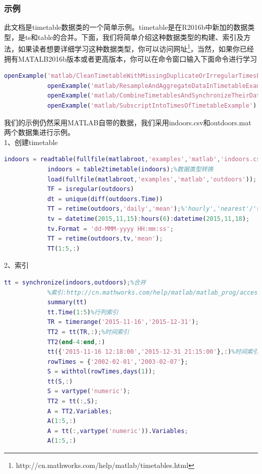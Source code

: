             \subsubsection{示例}
            此文档是timetable数据类的一个简单示例。timetable是在R2016b中新加的数据类型，是ts和table的合并。下面，我们将简单介绍这种数据类型的构建、索引及方法，如果读者想要详细学习这种数据类型，你可以访问网址\footnote{http://cn.mathworks.com/help/matlab/timetables.html}，当然，如果你已经拥有MATALB2016b版本或者更高版本，你可以在命令窗口输入下面命令进行学习
            \begin{lstlisting}[language = Matlab]
            openExample('matlab/CleanTimetableWithMissingDuplicateOrIrregularTimesExample')
            openExample('matlab/ResampleAndAggregateDataInTimetableExample')
            openExample('matlab/CombineTimetablesAndSynchronizeTheirDataExample')
            openExample('matlab/SubscriptIntoTimesOfTimetableExample')
            \end{lstlisting}
            \par
            我们的示例仍然采用MATLAB自带的数据，我们采用indoors.csv和outdoors.mat两个数据集进行示例。\\
            1、创建timetable
                \begin{lstlisting}[language=Matlab]
            indoors = readtable(fullfile(matlabroot,'examples','matlab','indoors.csv'));
            indoors = table2timetable(indoors);%数据类型转换
            load(fullfile(matlabroot,'examples','matlab','outdoors'));
            TF = isregular(outdoors)
            dt = unique(diff(outdoors.Time))
            TT = retime(outdoors,'daily','mean');%'hourly','nearest'/'spline'
            tv = datetime(2015,11,15):hours(6):datetime(2015,11,18);
            tv.Format = 'dd-MMM-yyyy HH:mm:ss';
            TT = retime(outdoors,tv,'mean');
            TT(1:5,:)
                \end{lstlisting}
            2、索引
                \begin{lstlisting}[language=Matlab]
            tt = synchronize(indoors,outdoors);%合并
            %索引:http://cn.mathworks.com/help/matlab/matlab_prog/access-data-in-a-table.html
            summary(tt)
            tt.Time(1:5)%行列索引
            TR = timerange('2015-11-16','2015-12-31');
            TT2 = tt(TR,:);%时间索引
            TT2(end-4:end,:)
            tt({'2015-11-16 12:18:00','2015-12-31 21:15:00'},:)%时间索引
            rowTimes = {'2002-02-01','2003-02-07'};
            S = withtol(rowTimes,days(1));
            tt(S,:)
            S = vartype('numeric');
            TT2 = tt(:,S);
            A = TT2.Variables;
            A(1:5,:)
            A = tt(:,vartype('numeric')).Variables;
            A(1:5,:)
                \end{lstlisting}
